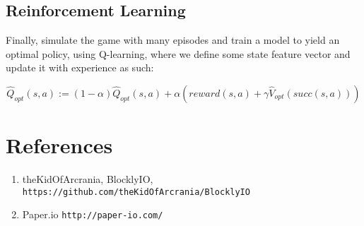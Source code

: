 \documentclass[10pt]{article}
\begin{document}
\subsection{Reinforcement Learning}

Finally, simulate the game with many episodes and train a model to yield an optimal policy, using Q-learning, where we define some state feature vector and update it with experience as such:

\[
\hat{Q}_{opt}(s,a) := (1-\alpha) \hat{Q}_{opt}(s,a) + \alpha (reward(s,a) + \gamma\hat{V}_{opt}(succ(s,a)))
\]


\clearpage

\section*{References}

\begin{enumerate}
    \item theKidOfArcrania, BlocklyIO, \texttt{https://github.com/theKidOfArcrania/BlocklyIO}
    \item Paper.io \texttt{http://paper-io.com/}
\end{enumerate}
\end{document}
